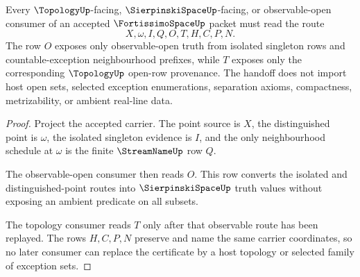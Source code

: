 \begin{theorem}
\label{thm:fortissimo-space-sierpinski-topology-handoff}
Every $\TopologyUp$-facing, $\SierpinskiSpaceUp$-facing, or observable-open consumer of an accepted $\FortissimoSpaceUp$ packet must read the route
$$
X,\omega,I,Q,O,T,H,C,P,N .
$$
The row $O$ exposes only observable-open truth from isolated singleton rows and countable-exception neighbourhood prefixes, while $T$ exposes only the corresponding $\TopologyUp$ open-row provenance. The handoff does not import host open sets, selected exception enumerations, separation axioms, compactness, metrizability, or ambient real-line data.
\end{theorem}
\begin{proof}
Project the accepted carrier. The point source is $X$, the distinguished point is $\omega$, the isolated singleton evidence is $I$, and the only neighbourhood schedule at $\omega$ is the finite $\StreamNameUp$ row $Q$.

The observable-open consumer then reads $O$. This row converts the isolated and distinguished-point routes into $\SierpinskiSpaceUp$ truth values without exposing an ambient predicate on all subsets.

The topology consumer reads $T$ only after that observable route has been replayed. The rows $H,C,P,N$ preserve and name the same carrier coordinates, so no later consumer can replace the certificate by a host topology or selected family of exception sets.
\end{proof}


\begin{closurestatus}{\FortissimoSpaceUp}
  \theoryclosure{\seedClosure}
  \formalstatus{\unformalizedV}
\end{closurestatus}

